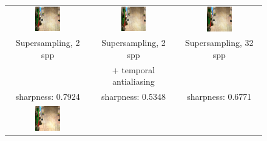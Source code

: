 \begin{figure}[t]
\begin{tabular}{@{}c@{}c@{}@{}c@{}}
	 \includegraphics[width=0.32\textwidth]{figures/ss_2x_rect_370_300_300_300_frame_211.png} &
		 \includegraphics[width=0.32\textwidth]{figures/ss_2x_taa_rect_370_300_300_300_frame_211.png} &
		  \includegraphics[width=0.32\textwidth]{figures/ss_32x_rect_370_300_300_300_frame_211.png} \\	 
Supersampling, 2 spp & Supersampling, 2 spp 	& Supersampling, 32 spp \\
  					 & + temporal antialiasing 	&  \\
sharpness: 0.7924 & sharpness: 0.5348 & sharpness: 0.6771  \\
	 \includegraphics[width=0.32\textwidth]{figures/srt_1_rect_370_300_300_300_frame_211.png} &

\end{tabular}
\end{figure}
